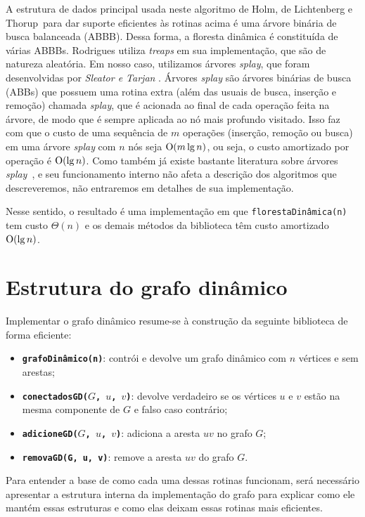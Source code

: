 A estrutura de dados principal usada neste algoritmo de Holm, de Lichtenberg e Thorup~para dar suporte eficientes às rotinas acima é uma árvore binária de busca balanceada (ABBB). Dessa forma, a floresta dinâmica é constituída de várias ABBBs. Rodrigues utiliza \textit{treaps} em sua implementação, que são de natureza aleatória. Em nosso caso, utilizamos árvores \textit{splay}, que foram desenvolvidas por \textit{Sleator e Tarjan} \cite{sleator}. Árvores \textit{splay} são árvores binárias de busca (ABBs) que possuem uma rotina extra (além das usuais de busca, inserção e remoção) chamada \textit{splay}, que é acionada ao final de cada operação feita na árvore, de modo que é sempre aplicada ao nó mais profundo visitado. Isso faz com que o custo de uma sequência de $m$ operações (inserção, remoção ou busca) em uma árvore \textit{splay} com $n$ nós seja $\mathrm{O}(m\lg n)$, ou seja, o custo amortizado por operação é $\mathrm{O}(\lg n)$. Como também já existe bastante literatura sobre árvores \textit{splay}~\cite[Lecture 12]{kozen}, e seu funcionamento interno não afeta a descrição dos algoritmos que descreveremos, não entraremos em detalhes de sua implementação.

Nesse sentido, o resultado é uma implementação em que \texttt{florestaDinâmica(n)} tem custo $\Theta(n)$ e os demais métodos da biblioteca têm custo amortizado $\mathrm{O}(\lg n)$.

\section{Estrutura do grafo dinâmico}
\label{sec:dynamic-graph-structure}

Implementar o grafo dinâmico resume-se à construção da seguinte biblioteca de forma eficiente:

\begin{itemize}
    \item \texttt{\textbf{grafoDinâmico(n)}}: contrói e devolve um grafo dinâmico com $n$ vértices e sem arestas;
    \item \texttt{\textbf{conectadosGD($G$, $u$, $v$)}}: devolve verdadeiro se os vértices $u$ e $v$ estão na mesma componente de $G$ e falso caso contrário;
    \item \texttt{\textbf{adicioneGD($G$, $u$, $v$)}}: adiciona a aresta $uv$ no grafo $G$;
    \item \texttt{\textbf{removaGD(G, u, v)}}: remove a aresta $uv$ do grafo $G$.
\end{itemize} 

Para entender a base de como cada uma dessas rotinas funcionam, será necessário apresentar a estrutura interna da implementação do grafo para explicar como ele mantém essas estruturas e como elas deixam essas rotinas mais eficientes.

